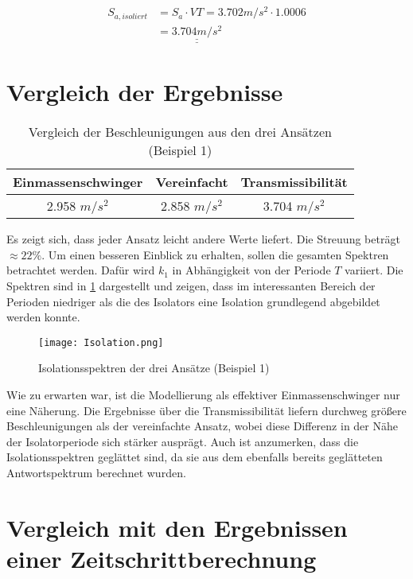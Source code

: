 \begin{align*}
S_{a,isoliert} &= S_a \cdot VT = 3.702 m/s^2 \cdot 1.0006\\
               &= \underline{\underline{3.704 m/s^2}}
\end{align*}

\pagebreak

\section{Vergleich der Ergebnisse}

\begin{table}[H]
\centering
\begin{tabular}{ |c|c|c| } 
 \hline
 Einmassenschwinger & Vereinfacht & Transmissibilität\\
 \hline\hline
 2.958 $m/s^2$ & 2.858 $m/s^2$ & 3.704 $m/s^2$\\
 \hline
\end{tabular}
\caption{Vergleich der Beschleunigungen aus den drei Ansätzen (Beispiel 1)}
\end{table}

Es zeigt sich, dass jeder Ansatz leicht andere Werte liefert. Die Streuung beträgt $\approx 22\%$. 
Um einen besseren Einblick zu erhalten, sollen die gesamten Spektren betrachtet werden. Dafür wird $k_1$ in Abhängigkeit von der Periode $T$ variiert. Die Spektren sind in \cref{fig:Isolation} dargestellt und zeigen, dass im interessanten Bereich der Perioden niedriger als die des Isolators eine Isolation grundlegend abgebildet werden konnte.

\begin{figure}[H]
    \centering
    \texttt{[image: Isolation.png]}
    \caption{Isolationsspektren der drei Ansätze (Beispiel 1)}
    \label{fig:Isolation}
\end{figure}

Wie zu erwarten war, ist die Modellierung als effektiver Einmassenschwinger nur eine Näherung. Die Ergebnisse über die Transmissibilität liefern durchweg größere Beschleunigungen als der vereinfachte Ansatz, wobei diese Differenz in der Nähe der Isolatorperiode sich stärker ausprägt. Auch ist anzumerken, dass die Isolationsspektren geglättet sind, da sie aus dem ebenfalls bereits geglätteten Antwortspektrum berechnet wurden.

\section{Vergleich mit den Ergebnissen einer Zeitschrittberechnung}

